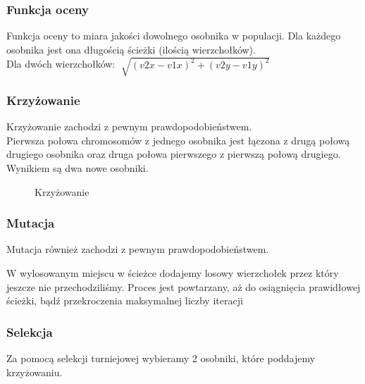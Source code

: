 \documentclass[a4paper,12pt]{article}
\begin{document}
\subsubsection{Funkcja oceny}
Funkcja oceny to miara jakości dowolnego osobnika w populacji. Dla każdego osobnika jest ona długością ścieżki (ilością wierzchołków).
\\
Dla dwóch wierzchołków: $\sqrt[]{(v2x-v1x)^{2} + (v2y-v1y)^{2}}$
\subsubsection{Krzyżowanie}
Krzyżowanie zachodzi z pewnym prawdopodobieństwem.
\\
Pierwsza połowa chromosomów z jednego osobnika jest łączona z drugą połową drugiego osobnika oraz druga połowa pierwszego z pierwszą połową drugiego. Wynikiem są dwa nowe osobniki. 
\begin{figure}[htbp]
\caption{Krzyżowanie}
\end{figure}
\subsubsection{Mutacja}
Mutacja również zachodzi z pewnym prawdopodobieństwem.

W wylosowanym miejscu w ścieżce dodajemy losowy wierzchołek przez który jeszcze nie przechodziliśmy. Proces jest powtarzany, aż do osiągnięcia prawidłowej ścieżki, bądź przekroczenia maksymalnej liczby iteracji
\subsubsection{Selekcja}
Za pomocą selekcji turniejowej wybieramy 2 osobniki, które poddajemy krzyżowaniu.
\end{document}
